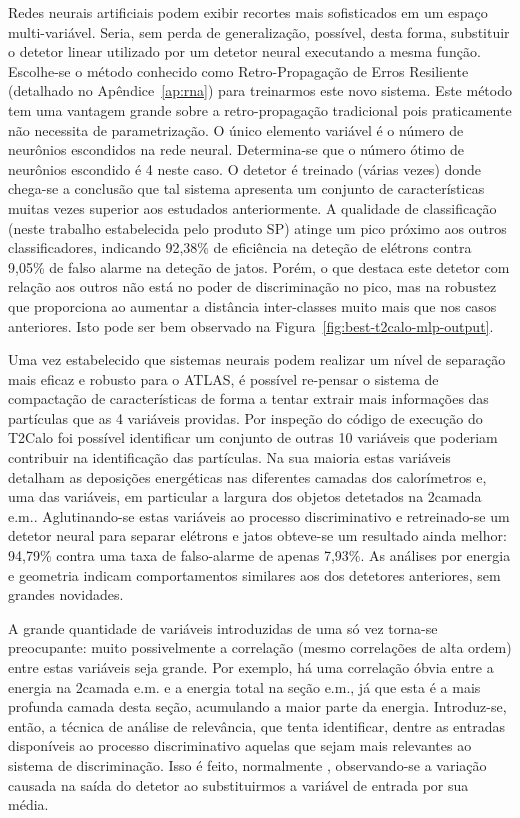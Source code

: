 Redes neurais artificiais podem exibir recortes mais sofisticados em um espaço
multi-variável. Seria, sem perda de generalização, possível, desta forma,
substituir o detetor linear utilizado por um detetor neural executando a mesma
função. Escolhe-se o método conhecido como Retro-Propagação de Erros
Resiliente \cite{rprop} (detalhado no Apêndice~\ref{ap:rna}) para treinarmos
este novo sistema. Este método tem uma vantagem grande sobre a
retro-propagação tradicional pois praticamente não necessita de
parametrização. O único elemento variável é o número de neurônios escondidos
na rede neural. Determina-se que o número ótimo de neurônios escondido é 4
neste caso. O detetor é treinado (várias vezes) donde chega-se a conclusão que
tal sistema apresenta um conjunto de características muitas vezes superior aos
estudados anteriormente. A qualidade de classificação (neste trabalho
estabelecida pelo produto SP) atinge um pico próximo aos outros
classificadores, indicando 92,38\% de eficiência na deteção de elétrons contra
9,05\% de falso alarme na deteção de jatos. Porém, o que destaca este detetor
com relação aos outros não está no poder de discriminação no pico, mas na
robustez que proporciona ao aumentar a distância inter-classes muito mais que
nos casos anteriores. Isto pode ser bem observado na
Figura~\ref{fig:best-t2calo-mlp-output}.

Uma vez estabelecido que sistemas neurais podem realizar um nível de separação
mais eficaz e robusto para o ATLAS, é possível re-pensar o sistema de
compactação de características de forma a tentar extrair mais informações das
partículas que as 4 variáveis providas. Por inspeção do código de execução do
T2Calo foi possível identificar um conjunto de outras 10 variáveis que
poderiam contribuir na identificação das partículas. Na sua maioria estas
variáveis detalham as deposições energéticas nas diferentes camadas dos
calorímetros e, uma das variáveis, em particular a largura dos objetos
detetados na 2\eira camada e.m.. Aglutinando-se estas variáveis ao processo
discriminativo e retreinado-se um detetor neural para separar elétrons e jatos
obteve-se um resultado ainda melhor: 94,79\% contra uma taxa de falso-alarme
de apenas 7,93\%. As análises por energia e geometria indicam comportamentos
similares aos dos detetores anteriores, sem grandes novidades.

A grande quantidade de variáveis introduzidas de uma só vez torna-se
preocupante: muito possivelmente a correlação (mesmo correlações de alta
ordem) entre estas variáveis seja grande. Por exemplo, há uma correlação óbvia
entre a energia na 2\eira camada e.m. e a energia total na seção e.m., já que
esta é a mais profunda camada desta seção, acumulando a maior parte da
energia. Introduz-se, então, a técnica de análise de relevância, que tenta
identificar, dentre as entradas disponíveis ao processo discriminativo aquelas
que sejam mais relevantes ao sistema de discriminação. Isso é feito,
normalmente \cite{relevance}, observando-se a variação causada na saída do
detetor ao substituirmos a variável de entrada por sua média.

